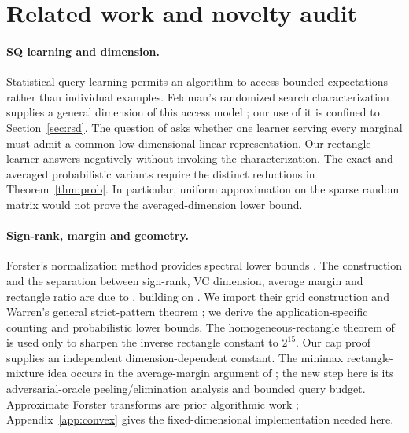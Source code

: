 \section{Related work and novelty audit}\label{sec:related}
\paragraph{SQ learning and dimension.}
Statistical-query learning permits an algorithm to access bounded expectations rather than individual examples. Feldman's randomized search characterization supplies a general dimension of this access model \citep{Feldman17}; our use of it is confined to Section~\ref{sec:rsd}. The question of \citet{FKS26} asks whether one learner serving every marginal must admit a common low-dimensional linear representation. Our rectangle learner answers negatively without invoking the characterization. The exact and averaged probabilistic variants require the distinct reductions in Theorem~\ref{thm:prob}. In particular, uniform approximation on the sparse random matrix would not prove the averaged-dimension lower bound.

\paragraph{Sign-rank, margin and geometry.}
Forster's normalization method provides spectral lower bounds \citep{Forster02}. The construction and the separation between sign-rank, VC dimension, average margin and rectangle ratio are due to \citet{HHPTZ22}, building on \citet{AMY16}. We import their grid construction and Warren's general strict-pattern theorem \citep{Warren68}; we derive the application-specific counting and probabilistic lower bounds. The homogeneous-rectangle theorem of \citet{APP05} is used only to sharpen the inverse rectangle constant to $2^{15}$. Our cap proof supplies an independent dimension-dependent constant. The minimax rectangle-mixture idea occurs in the average-margin argument of \citet[Theorem~3.1]{HHPTZ22}; the new step here is its adversarial-oracle peeling/elimination analysis and bounded query budget. Approximate Forster transforms are prior algorithmic work \citep{DKT22}; Appendix~\ref{app:convex} gives the fixed-dimensional implementation needed here.

